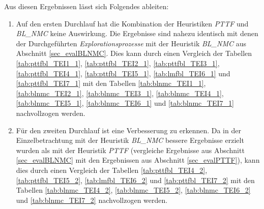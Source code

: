 \begin{multicols}{2}
\columnbreak
{}
\end{multicols}

\begin{multicols}{2}
\columnbreak
{}
\end{multicols}

\begin{multicols}{2}
\columnbreak
{}
\end{multicols}

\begin{multicols}{2}
\columnbreak
{}
\end{multicols}
\noindent
Aus diesen Ergebnissen lässt sich Folgendes ableiten:
\begin{enumerate}
\item Auf den ersten Durchlauf hat die Kombination der \Gls{Heuristik}en \emph{PTTF} und \emph{BL\_NMC} keine Auswirkung. Die Ergebnisse sind nahezu identisch mit denen der Durchgeführten \emph{Explorationsprozesse} mit der \Gls{Heuristik} \emph{BL\_NMC} aus Abschnitt \ref{sec_evalBLNMC}. Dies kann durch einen Vergleich der Tabellen \ref{tab:pttfbl_TEI1_1}, \ref{tab:pttfbl_TEI2_1}, \ref{tab:pttfbl_TEI3_1}, \ref{tab:pttfbl_TEI4_1}, \ref{tab:pttfbl_TEI5_1}, \ref{tab:lmfbl_TEI6_1} und  \ref{tab:pttfbl_TEI7_1} mit den Tabellen \ref{tab:blnmc_TEI1_1}, \ref{tab:blnmc_TEI2_1}, \ref{tab:blnmc_TEI3_1}, \ref{tab:blnmc_TEI4_1}, \ref{tab:blnmc_TEI5_1}, \ref{tab:blnmc_TEI6_1} und \ref{tab:blnmc_TEI7_1} nachvollzogen werden.

\item Für den zweiten Durchlauf ist eine Verbesserung  zu erkennen. Da in der Einzelbetrachtung mit der \Gls{Heuristik} \emph{BL\_NMC} bessere Ergebnisse erzielt wurden als mit der \Gls{Heuristik} \emph{PTTF} (vergleiche Ergebnisse aus Abschnitt \ref{sec_evalBLNMC} mit den Ergebnissen aus Abschnitt \ref{sec_evalPTTF}), kann dies durch einen Vergleich der Tabellen \ref{tab:pttfbl_TEI4_2}, \ref{tab:pttfbl_TEI5_2}, \ref{tab:lmfbl_TEI6_2} und  \ref{tab:pttfbl_TEI7_2} mit den Tabellen \ref{tab:blnmc_TEI4_2}, \ref{tab:blnmc_TEI5_2}, \ref{tab:blnmc_TEI6_2} und \ref{tab:blnmc_TEI7_2} nachvollzogen werden.
\end{enumerate}


